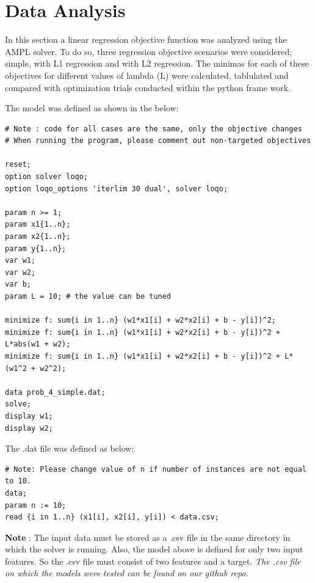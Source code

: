 \section{Data Analysis}

In this section a linear regression objective function was analyzed using the AMPL solver.  To do so, three regression objective scenarios were considered; simple, with L1 regression and with L2 regression. The minimas for each of these objectives for different values of lambda (L) were calculated, tablulated and compared with optimization trials conducted within the python frame work.  \newline 

\noindent
The model was defined as shown in the below:

\begin{verbatim}
# Note : code for all cases are the same, only the objective changes
# When running the program, please comment out non-targeted objectives 

reset;
option solver loqo;
option loqo_options 'iterlim 30 dual', solver loqo;

param n >= 1;
param x1{1..n};
param x2{1..n};
param y{1..n};
var w1;
var w2;
var b;
param L = 10; # the value can be tuned

minimize f: sum{i in 1..n} (w1*x1[i] + w2*x2[i] + b - y[i])^2;
minimize f: sum{i in 1..n} (w1*x1[i] + w2*x2[i] + b - y[i])^2 + L*abs(w1 + w2);
minimize f: sum{i in 1..n} (w1*x1[i] + w2*x2[i] + b - y[i])^2 + L*(w1^2 + w2^2);

data prob_4_simple.dat;
solve;
display w1;
display w2;
\end{verbatim}


\noindent
The .dat file was defined as below:

\begin{verbatim}
# Note: Please change value of n if number of instances are not equal to 10. 
data;
param n := 10;
read {i in 1..n} (x1[i], x2[i], y[i]) < data.csv; 
\end{verbatim}


\textbf{Note} : The input data must be stored as a .csv file in the same directory in which the solver is running. Also, the model above is defined for only two input features. So the .csv file must consist of two features and a target. \newline
\textit{The .csv file on which the models were tested can be found on our github repo.} \newline
 



